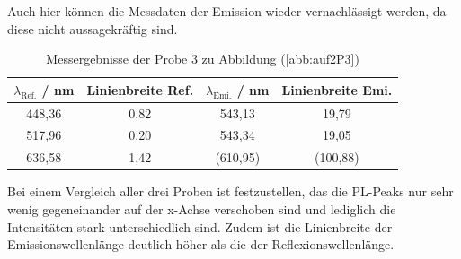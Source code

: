 Auch hier k\"{o}nnen die Messdaten der Emission wieder vernachl\"{a}ssigt werden, da diese nicht aussagekr\"{a}ftig sind.
\begin{table}
	\centering
	\caption{Messergebnisse der Probe 3 zu Abbildung (\ref{abb:auf2P3})}
\begin{tabular}{|cccc|}
	\hline
	{$\lambda_{\text{Ref.}}$ / nm}	&	{Linienbreite Ref.}	&	{$\lambda_{\text{Emi.}}$ / nm}	&	{Linienbreite Emi.}	\\
	\hline
	448,36 & 0,82 & 543,13 & 19,79 \\
	517,96 & 0,20 & 543,34 & 19,05 \\
	636,58 & 1,42 & (610,95) & (100,88) \\
	\hline
	\end{tabular}
\label{tab:auf2c}
\end{table}

Bei einem Vergleich aller drei Proben ist festzustellen, das die PL-Peaks nur sehr wenig gegeneinander auf der x-Achse verschoben sind und lediglich die Intensit\"{a}ten stark unterschiedlich sind.
Zudem ist die Linienbreite der Emissionswellenl\"{a}nge deutlich h\"{o}her als die der Reflexionswellenl\"{a}nge.

